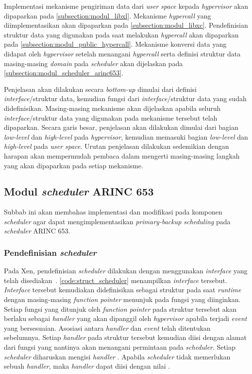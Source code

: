 Implementasi mekanisme pengiriman data dari \textit{user space} kepada \textit{hypervisor} akan
dipaparkan pada \autoref{subsection:modul_libxl}. Mekanisme \textit{hypercall} yang
diimplementasikan akan dipaparkan pada \autoref{subsection:modul_libxc}. Pendefinisian struktur
data yang digunakan pada saat melakukan \textit{hypercall} akan dipaparkan pada
\autoref{subsection:modul_public_hypercall}. Mekanisme konversi data yang didapat oleh
\textit{hypervisor} setelah menangani \textit{hypercall} serta definisi struktur data
masing-masing \textit{domain} pada \textit{scheduler} akan dijelaskan pada
\autoref{subsection:modul_scheduler_arinc653}.

Penjelasan akan dilakukan secara \textit{bottom-up} dimulai dari definisi
\textit{interface}/struktur data, kemudian fungsi dari \textit{interface}/struktur data yang
sudah didefinisikan. Masing-masing mekanisme akan dijelaskan apabila seluruh
\textit{interface}/struktur data yang digunakan pada mekanisme tersebut telah dipaparkan. Secara
garis besar, penjelasan akan dilakukan dimulai dari bagian \textit{low-level} dan
\textit{high-level} pada \textit{hypervisor}, kemudian memasuki bagian \textit{low-level} dan
\textit{high-level} pada \textit{user space}. Urutan penjelasan dilakukan sedemikian dengan
harapan akan mempermudah pembaca dalam mengerti masing-masing langkah yang akan dipaparkan pada
setiap mekanisme.

\subsection{Modul \textit{scheduler} ARINC 653}
\label{subsection:modul_scheduler_arinc653}

Subbab ini akan membahas implementasi dan modifikasi pada komponen \textit{scheduler} agar dapat
mengimplementasikan \textit{primary-backup scheduling} pada \textit{scheduler} ARINC 653.

\subsubsection{Pendefinisian \textit{scheduler}}

Pada Xen, pendefinisian \textit{scheduler} dilakukan dengan menggunakan \textit{interface} yang
telah disediakan~\citep[p.~218]{Chisnall2014}. \autoref{code:struct_scheduler} menampilkan
\textit{interface} tersebut. \textit{Interface} tersebut kemudiakan didefinisikan sebagai
struktur pada saat \textit{runtime} dengan masing-masing \textit{function pointer} menunjuk pada
fungsi yang diinginkan. Setiap fungsi yang ditunjuk oleh \textit{function pointer} pada struktur
tersebut akan berlaku sebagai \textit{handler} yang akan dipanggil oleh \textit{hypervisor}
apabila terjadi \textit{event} yang bersesuaian. Asosiasi antara \textit{handler} dan
\textit{event} telah ditentukan sebelumnya. Setiap \textit{handler} pada struktur tersebut
kemudian diisi dengan alamat dari fungsi yang nantinya akan menangani permintaan pada
\textit{scheduler}. Setiap \textit{scheduler} diharuskan mengisi \textit{handler}
. Apabila \textit{scheduler} tidak memerlukan sebuah \textit{handler}, maka
\textit{handler} dapat diisi dengan nilai .

